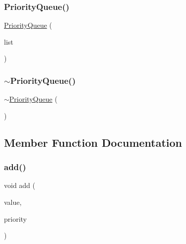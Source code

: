 \mbox{\label{classPriorityQueue_a3508a0b072e57d2c42cd799a0f89f1f4}} 
\subsubsection{\texorpdfstring{Priority\+Queue()}{PriorityQueue()}\hspace{0.1cm}{\footnotesize\ttfamily [2/2]}}
{\footnotesize\ttfamily \mbox{\hyperlink{classPriorityQueue}{Priority\+Queue}} (\begin{DoxyParamCaption}\item[{std\+::initializer\+\_\+list$<$ std\+::pair$<$ double, Value\+Type $>$ $>$}]{list }\end{DoxyParamCaption})}

\mbox{\label{classPriorityQueue_af97f1420d96fea6165720866508f06a3}} 
\subsubsection{\texorpdfstring{$\sim$\+Priority\+Queue()}{~PriorityQueue()}}
{\footnotesize\ttfamily $\sim$\mbox{\hyperlink{classPriorityQueue}{Priority\+Queue}} (\begin{DoxyParamCaption}{ }\end{DoxyParamCaption})\hspace{0.3cm}{\ttfamily [virtual]}}



\subsection{Member Function Documentation}
\mbox{\label{classPriorityQueue_aa604cec721b985421df5448c531a4482}} 
\subsubsection{\texorpdfstring{add()}{add()}}
{\footnotesize\ttfamily void add (\begin{DoxyParamCaption}\item[{const Value\+Type \&}]{value,  }\item[{double}]{priority }\end{DoxyParamCaption})}

